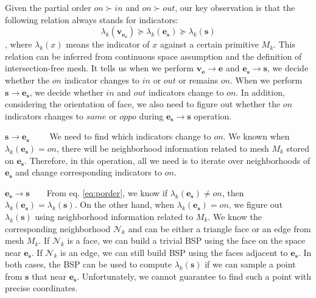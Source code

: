 \documentclass[10pt,journal,compsoc]{IEEEtran}
\begin{document}
Given the partial order $on \succ in$ and $on \succ out$, our key observation is that the following relation always stands for indicators:
\begin{equation}
\label{eq:porder}
\lambda_k(\bm{v}_{\bm{e}_{\bm{s}}}) \succeq \lambda_k(\bm{e}_{\bm{s}}) \succeq \lambda_k(\bm{s})
\end{equation}
, where $\lambda_k(x)$ means the indicator of $x$ against a certain primitive $M_k$. This relation can be inferred from continuous space assumption and the definition of intersection-free mesh. It tells us when we perform $\bm{v}_{\bm{e}}\to \bm{e}$ and $\bm{e}_{\bm{s}}\to \bm{s}$, we decide whether the $on$ indicator changes to $in$ or $out$ or remains $on$. When we perform $\bm{s}\to \bm{e}_{\bm{s}}$, we decide whether $in$ and $out$ indicators change to $on$. In addition, considering the orientation of face, we also need to figure out whether the $on$ indicators changes to $same$ or $oppo$ during $\bm{e}_{\bm{s}}\to \bm{s}$ operation.

\vspace{0.5em}
\noindent\textbf{$\bm{s\to \bm{e}_{\bm{s}}}$}~~~~ We need to find which indicators change to $on$. We known when $\lambda_k(\bm{e}_{\bm{s}})=on$, there will be neighborhood information related to mesh $M_k$ stored on $\bm{e}_{\bm{s}}$. Therefore, in this operation, all we need is to iterate over neighborhoods of $\bm{e}_{\bm{s}}$ and change corresponding indicators to $on$.


\vspace{0.5em}
\noindent\textbf{$\bm{\bm{e}_{\bm{s}}\to \bm{s}}$}~~~~From eq. \ref{eq:porder}, we know if $\lambda_k(\bm{e}_{\bm{s}}) \neq on$, then $\lambda_k(\bm{e}_{\bm{s}})=\lambda_k(\bm{s})$. On the other hand, when $\lambda_k(\bm{e}_{\bm{s}}) = on$, we figure out $\lambda_k(\bm{s})$ using neighborhood information related to $M_k$. We know the corresponding neighborhood $\mathcal{N}_k$ and can be either a triangle face or an edge from mesh $M_k$. If $\mathcal{N}_k$ is a face, we can build a trivial BSP \cite{thibault1987set} using the face on the space near $\bm{e}_{\bm{s}}$. If $\mathcal{N}_k$ is an edge, we can still build BSP using the faces adjacent to $\bm{e}_{\bm{s}}$. In both cases, the BSP can be used to compute $\lambda_k(\bm{s})$ if we can sample a point from $\bm{s}$ that near $\bm{e}_{\bm{s}}$. Unfortunately, we cannot guarantee to find such a point with precise coordinates.
\end{document}

